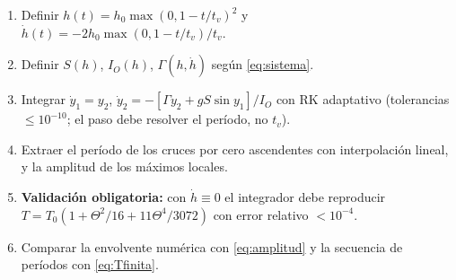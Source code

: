 \documentclass[11pt,a4paper]{article}
\begin{document}
\begin{enumerate}[leftmargin=*,itemsep=1pt]
\item Definir $h(t)=h_0\max(0,1-t/t_v)^2$ y $\dot h(t)=-2h_0\max(0,1-t/t_v)/t_v$.
\item Definir $S(h)$, $I_O(h)$, $\Gamma(h,\dot h)$ según \eqref{eq:sistema}.
\item Integrar $\dot y_1=y_2$, $\dot y_2=-[\Gamma y_2 + gS\sin y_1]/I_O$ con RK adaptativo
(tolerancias $\le10^{-10}$; el paso debe resolver el período, no $t_v$).
\item Extraer el período de los cruces por cero ascendentes con interpolación lineal, y la
amplitud de los máximos locales.
\item \textbf{Validación obligatoria:} con $\dot h\equiv0$ el integrador debe reproducir
$T=T_0(1+\Theta^2/16+11\Theta^4/3072)$ con error relativo $<10^{-4}$.
\item Comparar la envolvente numérica con \eqref{eq:amplitud} y la secuencia de períodos con
\eqref{eq:Tfinita}.
\end{enumerate}
\end{document}
